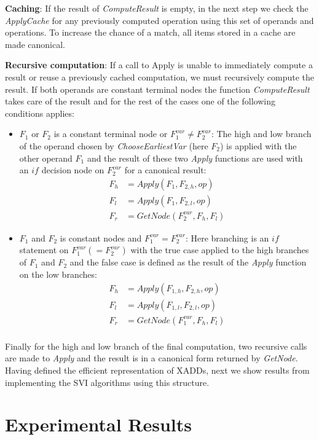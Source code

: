\documentclass[twoside,11pt]{article}
\begin{document}
\textbf{Caching}:
If the result of 	\emph{ComputeResult} is empty, in the next step we check the  \emph{ApplyCache} for any previously computed operation using this set of operands and operations. To increase the chance of a match, all items stored in a cache are made canonical.

\textbf{Recursive computation}:
If a call to Apply is unable to immediately compute a result or reuse a previously cached computation, we must recursively compute the result. If both operands are constant terminal nodes the function \emph{ComputeResult} takes care of the result and for the rest of the cases one of the following conditions applies: 
\begin{itemize}
\item $F_1$ or $F_2$ is a constant terminal node or $F_1^{var} \neq F_2^{var} $: The high and low branch of the operand chosen by \emph{ChooseEarliestVar} (here $F_2$) is applied with the other operand $F_1$ and the result of these two \emph{Apply} functions are used with an $\mathit{if}$ decision node on $F_2^{var}$ for a canonical result:
\begin{align*}
F_h &= Apply (F_1 , F_{2,h},op) \\
F_l &= Apply (F_1 , F_{2,l},op)  \\
F_r &= GetNode (F_2^{var} , F_h,F_l) 
\end{align*}
\item $F_1$ and $F_2$ is constant nodes and $F_1^{var} = F_2^{var} $: Here branching is an $if$ statement on $F_1^{var} (=F_2^{var})$ with the true case applied to the high branches of $F_1$ and $F_2$ and the false case is defined as the result of the \emph{Apply} function on the low branches:
\begin{align*}
F_h &= Apply (F_{1,h} , F_{2,h},op)  \\
F_l &= Apply (F_{1,l} , F_{2,l},op)  \\
F_r &= GetNode (F_1^{var} , F_h,F_l)  \\
\end{align*}
\end{itemize}

Finally for the high and low branch of the final computation, two recursive calls are made to \emph{Apply} and the result is in a canonical form returned by \emph{GetNode}. 
Having defined the efficient representation of XADDs, next we show results from implementing the SVI algorithms using this structure.

\section{Experimental Results} \label{results}
\vspace*{-0.05in}
\end{document}
